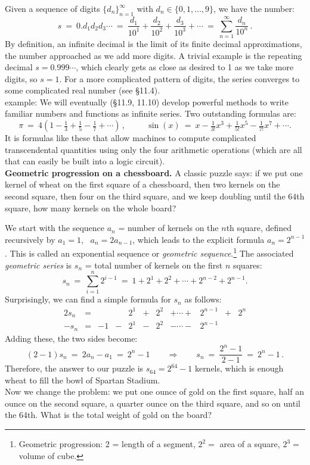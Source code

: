 \documentclass[11pt]{article}
\begin{document}
Given a sequence of digits $\{d_n\}_{n=1}^\infty$ with $d_n\in\{0,1,\ldots, 9\}$,
we have the number:
$$
s \ =\ 0.d_1d_2d_3\cdots\ =\  \frac{d_1}{10^1} + \frac{d_2}{10^2} + \frac{d_3}{10^3} + \cdots
\ =\ \sum\limits_{n=1}^\infty \frac{d_n}{10^n}\,. 
$$
By definition, an infinite decimal is the limit of its finite decimal approximations,
the number approached as we add more digits.
A trivial example is the repeating decimal $s=0.999\cdots$, which
clearly gets as close as desired to 1 as we take more
digits, so $s=1$. For a more complicated pattern of digits, the series converges to some complicated real number (see \S11.4).
\\[.5em]
{\sc example:} We will eventually (\S11.9, 11.10) develop powerful methods to write familiar numbers and functions as infinite series. Two outstanding formulas are:
$$
\pi \ =\ 4(1 - \tfrac13 + \tfrac 15 -\tfrac17+\cdots)\,,
\qquad\ \ 
\sin(x) \ =\
x -\tfrac1{3!}x^3 +\tfrac1{5!}x^5 -\tfrac1{7!}x^7 +\cdots.
$$
It is formulas like these that allow machines to compute complicated transcendental quantities using only the four arithmetic operations (which are all that can easily be  built into a logic circuit).
\\[1em]
{\bf Geometric progression on a chessboard.} 
A classic puzzle says: if we put one kernel of wheat on the first square of a chessboard, then two kernels on the second square, then four on the third square, and we keep doubling until the $64$th  square, how many kernels on the whole board?

We start with the sequence $a_n$ = number of kernels on the $n$th square, defined recursively by 
$a_1=1$, \ $a_n=2a_{n-1}$, which leads to the explicit
formula $a_n=2^{n-1}$.
This is called an exponential sequence or {\it geometric sequence}.\footnote{Geometric progression: 2 = length of a segment, $2^2 =$ area of a square, $2^3 =$ volume of cube.}
The associated {\it geometric series} is $s_n$ = total number of kernels on the first $n$ squares:
$$
s_n \ =\  \sum_{i=1}^n 2^{i-1}
\ =\ 
1 + 2^1 + 2^2 + \cdots + 2^{n-2} + 2^{n-1}.
$$
Surprisingly, we can find a simple formula for $s_n$ as follows:
\\[-.4em]
$$\begin{array}{rcccccccccc}
2 s_n &=&& &2^1&+& 2^2&+\cdots + &2^{n-1}&+&2^n\\[.5em]
-s_n&=& -1 & - &2^1 & - &2^2 &-\cdots- &2^{n-1}&
\end{array}$$
Adding these, the two sides become:
$$(2-1)s_n \ =\ 2a_n-a_1 \ =\ 2^n-1
\qquad\Longrightarrow\qquad
s_n \ =\ \frac{2^n-1}{2-1} \ =\ 2^n-1\,.
$$
Therefore, the answer to our puzzle is $s_{64}=2^{64}-1$ kernels, which
is enough wheat to fill the bowl of Spartan Stadium.
\\[.5em]
Now we change the problem: we put one ounce of gold on the first square, half an ounce on the second square,
a quarter ounce on the third square,
and so on until the 64th.
What is the total weight of gold on the board?
\end{document}
